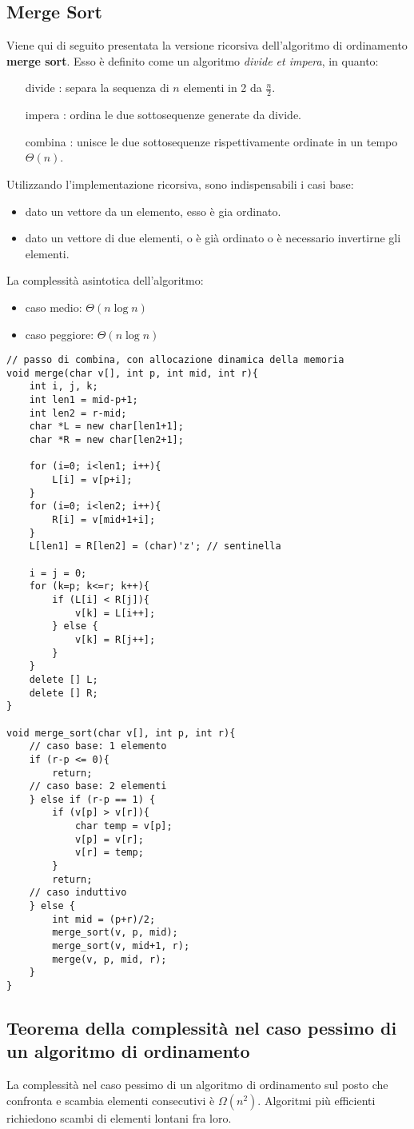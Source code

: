 \subsection{Merge Sort}
Viene qui di seguito presentata la versione ricorsiva dell'algoritmo di ordinamento \textbf{merge sort}. Esso è definito come un algoritmo \textit{divide et impera}, in quanto:
\begin{itemize}[noitemsep]
	\item[divide]: separa la sequenza di $n$ elementi in 2 da $\frac{n}{2}$.
	\item[impera]: ordina le due sottosequenze generate da divide.
	\item[combina]: unisce le due sottosequenze rispettivamente ordinate in un tempo $\varTheta(n)$.
\end{itemize}
Utilizzando l'implementazione ricorsiva, sono indispensabili i casi base:
\begin{itemize}[noitemsep, nolistsep]
	\item dato un vettore da un elemento, esso è gia ordinato.
	\item dato un vettore di due elementi, o è già ordinato o è necessario invertirne gli elementi.
\end{itemize}
La complessità asintotica dell'algoritmo:
\begin{itemize}[noitemsep, nolistsep]
	\item caso medio: $\varTheta(n\log n)$
	\item caso peggiore: $\varTheta(n\log n)$
\end{itemize}
\begin{lstlisting}[title={Merge Sort}]
// passo di combina, con allocazione dinamica della memoria
void merge(char v[], int p, int mid, int r){
    int i, j, k;
    int len1 = mid-p+1;
    int len2 = r-mid;
    char *L = new char[len1+1];
    char *R = new char[len2+1];

    for (i=0; i<len1; i++){
        L[i] = v[p+i];
    }
    for (i=0; i<len2; i++){
        R[i] = v[mid+1+i];
    }
    L[len1] = R[len2] = (char)'z'; // sentinella

    i = j = 0;
    for (k=p; k<=r; k++){
        if (L[i] < R[j]){
            v[k] = L[i++];
        } else {
            v[k] = R[j++];
        }
    }
    delete [] L;
    delete [] R;
}

void merge_sort(char v[], int p, int r){
    // caso base: 1 elemento
    if (r-p <= 0){
        return;
    // caso base: 2 elementi
    } else if (r-p == 1) {
        if (v[p] > v[r]){
            char temp = v[p];
            v[p] = v[r];
            v[r] = temp;
        }
        return;
    // caso induttivo
    } else {
        int mid = (p+r)/2;
        merge_sort(v, p, mid);
        merge_sort(v, mid+1, r);
        merge(v, p, mid, r);
    }
}

\end{lstlisting}

\subsection{Teorema della complessità nel caso pessimo di un algoritmo di ordinamento}
La complessità nel caso pessimo di un algoritmo di ordinamento sul posto che confronta e scambia elementi consecutivi è $\varOmega(n^2)$. Algoritmi più efficienti richiedono scambi di elementi lontani fra loro.